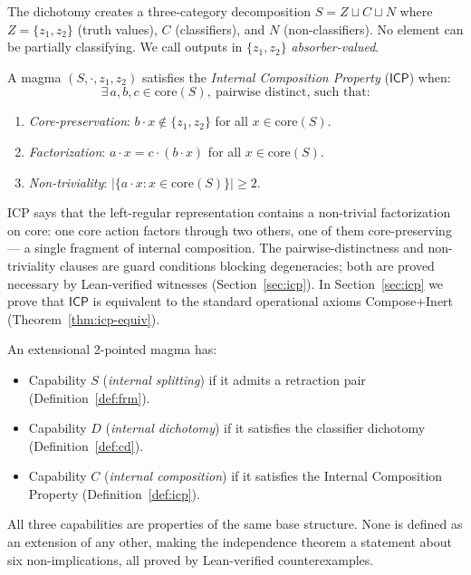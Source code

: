 \documentclass[sigconf,screen]{acmart}
\newcommand{\dotop}{\cdot}
\newcommand{\ICP}{\textsf{ICP}}
\newcommand{\core}{\mathrm{core}}
\theoremstyle{remark}
\begin{document}
The dichotomy creates a three-category decomposition
$S = Z \sqcup C \sqcup N$ where $Z = \{z_1, z_2\}$ (truth values),
$C$ (classifiers), and $N$ (non-classifiers). No element can be partially
classifying. We call outputs in $\{z_1, z_2\}$ \emph{absorber-valued}.

\begin{definition}
\label{def:icp}
A magma $(S, \dotop, z_1, z_2)$ satisfies the \emph{Internal Composition
Property} ($\ICP$) when:
\[
\exists\, a, b, c \in \core(S),\ \text{pairwise distinct, such that:}
\]
\begin{enumerate}
  \item \emph{Core-preservation}: $b \dotop x \notin \{z_1, z_2\}$ for
    all $x \in \core(S)$.
  \item \emph{Factorization}: $a \dotop x = c \dotop (b \dotop x)$ for
    all $x \in \core(S)$.
  \item \emph{Non-triviality}: $|\{a \dotop x : x \in \core(S)\}| \geq 2$.
\end{enumerate}
\end{definition}

ICP says that the left-regular representation contains a non-trivial
factorization on core: one core action factors through two others, one
of them core-preserving --- a single fragment of internal composition.
The pairwise-distinctness and non-triviality clauses are guard conditions
blocking degeneracies; both are proved necessary by Lean-verified
witnesses (Section~\ref{sec:icp}). In Section~\ref{sec:icp} we prove
that $\ICP$ is equivalent to the standard operational axioms
Compose+Inert (Theorem~\ref{thm:icp-equiv}).

\begin{definition}
\label{def:capabilities}
An extensional 2-pointed magma has:
\begin{itemize}
  \item Capability $S$ (\emph{internal splitting}) if it admits a
    retraction pair (Definition~\ref{def:frm}).
  \item Capability $D$ (\emph{internal dichotomy}) if it satisfies the
    classifier dichotomy (Definition~\ref{def:cd}).
  \item Capability $C$ (\emph{internal composition}) if it satisfies the
    Internal Composition Property (Definition~\ref{def:icp}).
\end{itemize}
\end{definition}

All three capabilities are properties of the same base structure. None
is defined as an extension of any other, making the independence theorem
a statement about six non-implications, all proved by Lean-verified
counterexamples.
\end{document}
